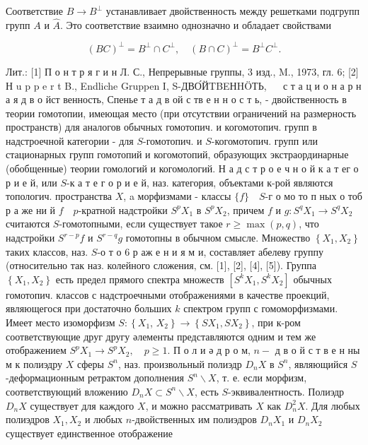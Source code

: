 \documentclass[10pt]{article}
\begin{document}
Соответствие $B \rightarrow B^{\perp}$ устанавливает двойственность между решетками подгрупп групп $A$ и $\hat{A}$. Это соответствие взаимно однозначно и обладает свойствами



\[

(B C)^{\perp}=B^{\perp} \cap C^{\perp}, \quad(B \cap C)^{\perp}=B^{\perp} C^{\perp} .

\]



Лит.: [1] П о н т р я г и н Л. С., Непрерывные группы, 3 изд., M., 1973, гл. 6; [2] Н u p p e r t B., Endliche Gruppen I, S-ДВО́ЙTBEНHÖТЬ, $\quad$ с т а ц и о н а р н а я д в о йст венность, Спенье т а д в ой с тв е н н о с т ь, - двойственность в теории гомотопии, имеющая место (при отсутствии ограничений на размерность пространств) для аналогов обычных гомотопич. и когомотопич. групп в надстроечной категории - для $S$-гомотопич. и $S$-когомотопич. групп или стационарных групп гомотопий и когомотопий, образующих экстраординарные (обобщенные) теории гомологий и когомологий. Н а д с т р о е ч н о й к а т ег о р и е й, или $S$-к а т е г о р и е й, наз. категория, объектами к-рой являются топологич. пространства $X$, a морфизмами - классы $\{f\} \quad S$-г о мо то п ных о тоб р а же ни й $f \quad p$-кратной надстройки $S^{p} X_{1}$ в $S^{p} X_{2}$, причем $f$ и $g: S^{q} X_{1} \rightarrow S^{q} X_{2}$ считаются $S$-гомотопными, если существует такое $r \geqslant \max (p, q)$, что надстройки $S^{r-p} f$ и $S^{r-q} g$ гомотопны в обычном смысле. Множество $\left\{X_{1}, X_{2}\right\}$ таких классов, наз. $S$-о т о 6 р аж е н и я м и, составляет абелеву группу (относительно так наз. колейного сложения, см. [1], [2], [4], [5]). Группа $\left\{X_{1}, X_{2}\right\}$ есть предел прямого спектра множеств $\left[S^{k} X_{1}, S^{k} X_{2}\right]$ обычных гомотопич. классов с надстроечными отображениями в качестве проекций, являющегося при достаточно больших $k$ спектром групп с гомоморфизмами. Имеет место изоморфизм $S:\left\{X_{1}\right.$, $\left.X_{2}\right\} \rightarrow\left\{S X_{1}, S X_{2}\right\}$, при к-ром соответствующие друг другу әлементы представляются одним и тем же отображением $S^{p} X_{1} \rightarrow S^{p} X_{2}, \quad p \geqslant 1$. П о л и ә д р о м, $n-$ д в о й с т в е н ны м к полиэдру $X$ сферы $S^{n}$, наз. произвольный полиэдр $D_{n} X$ в $S^{n}$, являющийся $S$-деформационным ретрактом дополнения $S^{n} \backslash X$, т. е. если морфизм, соответствующий вложению $D_{n} X \subset S^{n} \backslash X$, есть $S$-эквивалентность. Полиэдр $D_{n} X$ существует для каждого $X$, и можно рассматривать $X$ как $D_{n}^{2} X$. Для любых полиэдров $X_{1}, X_{2}$ и любых $n$-двойственных им полиэдров $D_{n} X_{1}$ и $D_{n} X_{2}$ существует единственное отображение
\end{document}
